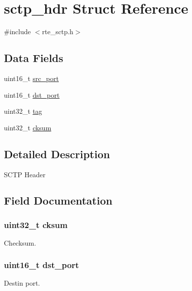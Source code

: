 \hypertarget{structsctp__hdr}{}\section{sctp\+\_\+hdr Struct Reference}
\label{structsctp__hdr}


{\ttfamily \#include $<$rte\+\_\+sctp.\+h$>$}

\subsection*{Data Fields}
\begin{DoxyCompactItemize}
\item 
uint16\+\_\+t \hyperlink{structsctp__hdr_ab98974981cf4c143fcee028643f313e6}{src\+\_\+port}
\item 
uint16\+\_\+t \hyperlink{structsctp__hdr_ae18defed4756b8c15e34718f51e86e55}{dst\+\_\+port}
\item 
uint32\+\_\+t \hyperlink{structsctp__hdr_a1c50fcd1195659821729f52af8f3bb7d}{tag}
\item 
uint32\+\_\+t \hyperlink{structsctp__hdr_a0e993f40ec1686b78588605d4e0bde23}{cksum}
\end{DoxyCompactItemize}


\subsection{Detailed Description}
S\+C\+T\+P Header 

\subsection{Field Documentation}
\hypertarget{structsctp__hdr_a0e993f40ec1686b78588605d4e0bde23}{}
\subsubsection[{cksum}]{\setlength{\rightskip}{0pt plus 5cm}uint32\+\_\+t cksum}\label{structsctp__hdr_a0e993f40ec1686b78588605d4e0bde23}
Checksum. \hypertarget{structsctp__hdr_ae18defed4756b8c15e34718f51e86e55}{}
\subsubsection[{dst\+\_\+port}]{\setlength{\rightskip}{0pt plus 5cm}uint16\+\_\+t dst\+\_\+port}\label{structsctp__hdr_ae18defed4756b8c15e34718f51e86e55}
Destin port. \hypertarget{structsctp__hdr_ab98974981cf4c143fcee028643f313e6}{}
